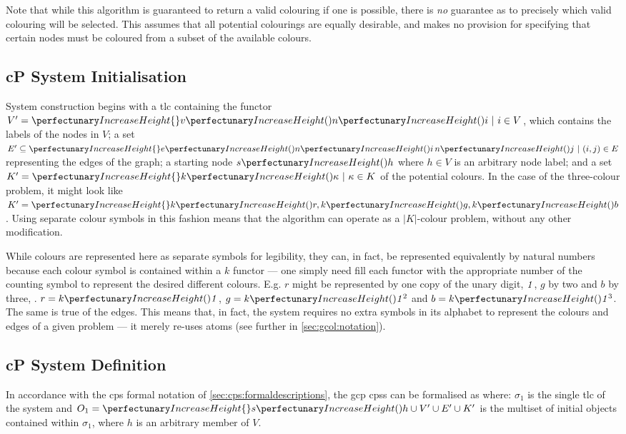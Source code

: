 Note that while this algorithm is guaranteed to return a valid colouring if one is possible, there is \emph{no} guarantee as to precisely which valid colouring will be selected.  This  assumes that all potential colourings are equally desirable, and makes no provision for specifying that certain nodes must be coloured from a subset of the available colours.

\subsection{\label{sec:gcol:sysinit}cP System Initialisation}
System construction begins with a \gls{tlc} containing the \gls{functor} \(V' = \cpset{\cpfunc{v}{\cpfunc{n}{i}} ~|~i \in V}\), which contains the labels of the nodes in \(V\); a set \(E' \subseteq \cpset{\cpfunc{e}{\cpfunc{n}{i} \, \cpfunc{n}{j}} ~|~(i,j) \in E}\) representing the edges of the graph; a starting node \(\cpfunc{s}{h}\) where \(h \in V\) is an arbitrary node label; and a set \(K' = \cpset{\cpfunc{k}{\kappa} ~|~ \kappa \in K}\) of  the potential colours.  In the case of the three-colour problem, it might look like \(K' = \cpset{\cpfunc{k}{r}, \cpfunc{k}{g}, \cpfunc{k}{b}}\). Using separate colour symbols in this fashion means that the algorithm can operate as a \(|K|\)-colour problem, without any other modification.

While colours are represented here as separate symbols for legibility, they can, in fact, be represented equivalently by natural numbers because each colour symbol is contained within a \(k\) \gls{functor} --- one simply need fill each \gls{functor} with the appropriate number of the counting symbol to represent the desired different colours.  E.g. \(r\) might be represented by one copy of the unary digit, \(\mathit{1}\), \(g\) by two and \(b\) by three, \ie{}. \(r = \cpfunc{k}{\cpundig}\), \(g = \cpfunc{k}{\cpundig^2}\) and \(b = \cpfunc{k}{\cpundig^3}\).  The same is true of the edges.  This means that, in fact, the system requires no extra symbols in its alphabet to represent the colours and edges of a given problem --- it merely re-uses atoms (see further in \cref{sec:gcol:notation}).

\subsection{\label{sec:gcol:notation}cP System Definition}

In accordance with the \gls{cps} formal notation of \cref{sec:cps:formaldescriptions}, the \gls{gcp} \glspl{cps} can be formalised as  where: \(\sigma_1\) is the single \gls{tlc} of the system and \(O_1 = \cpset{\cpfunc{s}{h}} \cup V' \allowbreak \cup E' \allowbreak \cup K'\) is the multiset of initial objects contained within \(\sigma_1\), where \(h\) is an arbitrary member of \(V\).


